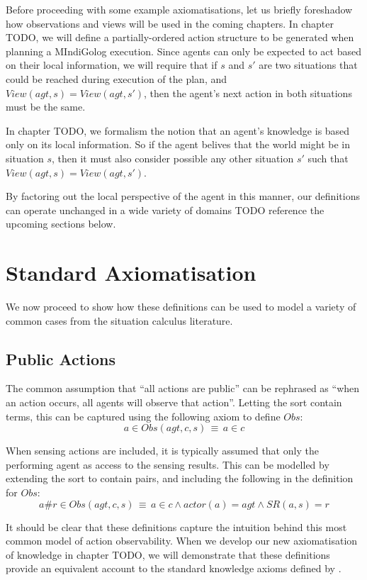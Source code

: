 Before proceeding with some example axiomatisations, let us briefly
foreshadow how observations and views will be used in the coming chapters.
In chapter TODO, we will define a partially-ordered action structure
to be generated when planning a MIndiGolog execution. Since agents
can only be expected to act based on their local information, we will
require that if $s$ and $s'$ are two situations that could be reached
during execution of the plan, and $View(agt,s)=View(agt,s')$, then
the agent's next action in both situations must be the same.

In chapter TODO, we formalism the notion that an agent's knowledge
is based only on its local information. So if the agent belives that
the world might be in situation $s$, then it must also consider possible
any other situation $s'$ such that $View(agt,s)=View(agt,s')$.

By factoring out the local perspective of the agent in this manner,
our definitions can operate unchanged in a wide variety of domains
TODO reference the upcoming sections below.


\section{Standard Axiomatisation}

We now proceed to show how these definitions can be used to model
a variety of common cases from the situation calculus literature.


\subsection{Public Actions}

The common assumption that {}``all actions are public'' can be rephrased
as {}``when an action occurs, all agents will observe that action''.
Letting the sort contain terms,
this can be captured using the following axiom to define $Obs$:\[
a\in Obs(agt,c,s)\,\equiv\, a\in c\]


When sensing actions are included, it is typically assumed that only
the performing agent as access to the sensing results. This can be
modelled by extending the  sort to contain 
pairs, and including the following in the definition for $Obs$:\[
a\#r\in Obs(agt,c,s)\,\equiv\, a\in c\wedge actor(a)=agt\wedge SR(a,s)=r\]


It should be clear that these definitions capture the intuition behind
this most common model of action observability. When we develop our
new axiomatisation of knowledge in chapter TODO, we will demonstrate
that these definitions provide an equivalent account to the standard
knowledge axioms defined by \citet{scherl03sc_knowledge}.


